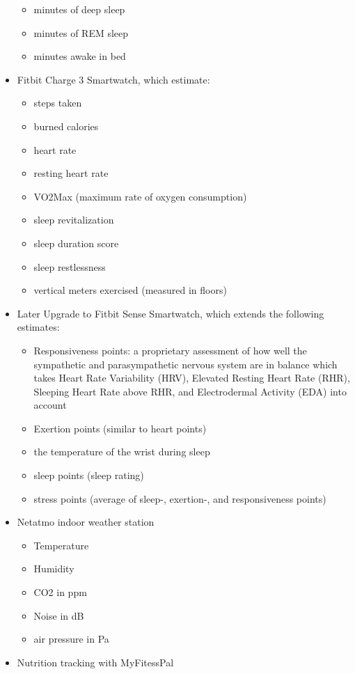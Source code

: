 \documentclass[conference]{IEEEtran}
\begin{document}
\begin{itemize}
\begin{itemize}
\item minutes of deep sleep
\item minutes of REM sleep
\item minutes awake in bed
\end{itemize}
\item Fitbit Charge 3 Smartwatch, which estimate:
   \begin{itemize}
\item steps taken
\item burned calories
\item heart rate
\item resting heart rate
\item VO2Max (maximum rate of oxygen consumption)
\item sleep revitalization
\item sleep duration score
\item sleep restlessness
\item vertical meters exercised (measured in floors)
\end{itemize}
\item Later Upgrade to Fitbit Sense Smartwatch, which extends the following estimates:
   \begin{itemize}
\item Responsiveness points: a proprietary assessment of how well the sympathetic and parasympathetic nervous system are in balance which takes Heart Rate Variability (HRV), Elevated Resting Heart Rate (RHR), Sleeping Heart Rate above RHR, and Electrodermal Activity (EDA) into account
\item Exertion points (similar to heart points)
\item the temperature of the wrist during sleep
\item sleep points (sleep rating)
\item stress points (average of sleep-, exertion-, and responsiveness points)
\end{itemize}
\item Netatmo indoor weather station
   \begin{itemize}
\item Temperature
\item Humidity
\item CO2 in ppm
\item Noise in dB
\item air pressure in Pa
\end{itemize}
\item Nutrition tracking with MyFitessPal
   \begin{itemize}

\end{itemize}
\end{itemize}
\end{document}

